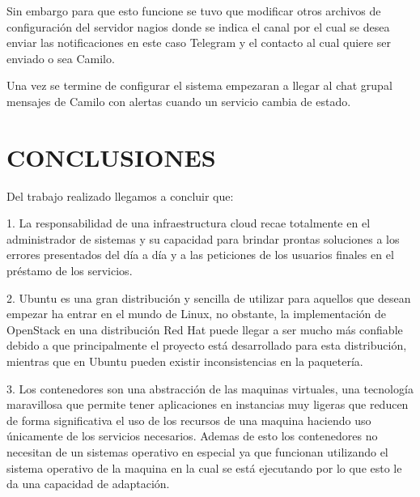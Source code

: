    
     
     Sin embargo para que esto funcione se tuvo que modificar otros archivos de configuración del servidor nagios donde se indica el canal por el cual se desea enviar las notificaciones en este caso Telegram y el contacto al cual quiere ser enviado o sea Camilo.
     
     
     
     
     
     Una vez se termine de configurar el sistema empezaran a llegar al chat grupal mensajes de Camilo con alertas cuando un servicio cambia de estado.
    
    
    
   
   
   
   
   
   
   
    
    \newpage\chapter{CONCLUSIONES}
    
    Del trabajo realizado llegamos a concluir que:
    
    1. La responsabilidad de una infraestructura cloud recae totalmente en el administrador de sistemas y su capacidad para brindar prontas soluciones a los errores presentados del día a día y a las peticiones de los usuarios finales en el préstamo de los servicios. 
    
    2. Ubuntu es una gran distribución y sencilla de utilizar para aquellos que desean empezar ha entrar en el mundo de Linux, no obstante, la implementación de OpenStack en una distribución Red Hat puede llegar a ser mucho más confiable debido a que principalmente el proyecto está desarrollado para esta distribución, mientras que en Ubuntu pueden existir inconsistencias en la paquetería.
    
    3. Los contenedores son una abstracción de las maquinas virtuales, una tecnología maravillosa que permite tener aplicaciones en instancias muy  ligeras que reducen de forma significativa el uso de los recursos de una maquina haciendo uso únicamente de los servicios necesarios. Ademas de esto los contenedores no necesitan de un sistemas operativo en especial ya que funcionan utilizando el sistema operativo de la maquina en la cual se está ejecutando por lo que esto le da una capacidad de adaptación.  
    
